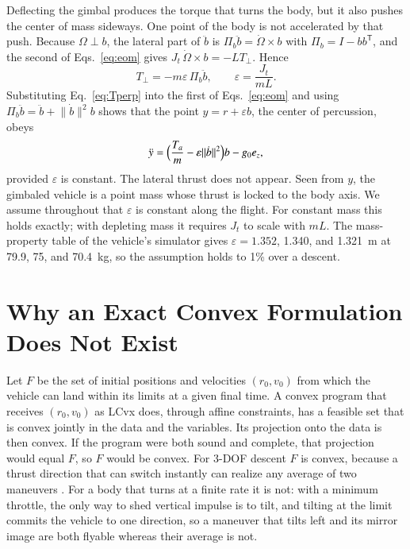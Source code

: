 \documentclass[10pt,letterpaper]{article}
\theoremstyle{aiaa}
\newcommand{\norm}[1]{\lVert #1\rVert}
\newcommand{\ez}{e_z}
\newcommand{\Pib}{\Pi_b}
\begin{document}
Deflecting the gimbal produces the torque that turns the body, but it also pushes the center of mass sideways. One point of the
body is not accelerated by that push. Because $\Omega\perp b$, the lateral part of $\ddot b$ is $\Pib\ddot b=\dot\Omega\times b$
with $\Pib=I-bb^{\mathsf T}$, and the second of Eqs.~\eqref{eq:eom} gives $J_t\,\dot\Omega\times b=-LT_\perp$. Hence
\begin{equation}\label{eq:Tperp}
T_\perp=-m\varepsilon\,\Pib\ddot b,\qquad \varepsilon=\frac{J_t}{mL}.
\end{equation}
Substituting Eq.~\eqref{eq:Tperp} into the first of Eqs.~\eqref{eq:eom} and using $\Pib\ddot b=\ddot b+\norm{\dot b}^2b$ shows
that the point $y=r+\varepsilon b$, the center of percussion, obeys
\begin{equation}\label{eq:cop}
\ddot y=\Bigl(\frac{T_a}{m}-\varepsilon\norm{\dot b}^2\Bigr)b-g_0\ez ,
\end{equation}
provided $\varepsilon$ is constant. The lateral thrust does not appear. Seen from $y$, the gimbaled vehicle is a point mass
whose thrust is locked to the body axis. We assume throughout that $\varepsilon$ is constant along the flight. For constant mass
this holds exactly; with depleting mass it requires $J_t$ to scale with $mL$. The mass-property table of the vehicle's
simulator gives $\varepsilon=1.352$, 1.340, and 1.321~m at 79.9, 75, and 70.4~kg, so the assumption holds to 1\% over a descent.

\section{Why an Exact Convex Formulation Does Not Exist}\label{sec:imposs}
Let $F$ be the set of initial positions and velocities $(r_0,v_0)$ from which the vehicle can land within its limits at a given
final time. A convex program that receives $(r_0,v_0)$ as LCvx does, through affine constraints, has a feasible set that is
convex jointly in the data and the variables. Its projection onto the data is then convex. If the program were both sound and
complete, that projection would equal $F$, so $F$ would be convex. For 3-DOF descent $F$ is convex, because a thrust direction
that can switch instantly can realize any average of two maneuvers \cite{aumann1965}. For a body that turns at a finite rate it
is not: with a minimum throttle, the only way to shed vertical impulse is to tilt, and tilting at the limit commits the vehicle
to one direction, so a maneuver that tilts left and its mirror image are both flyable whereas their average is not.
\end{document}
